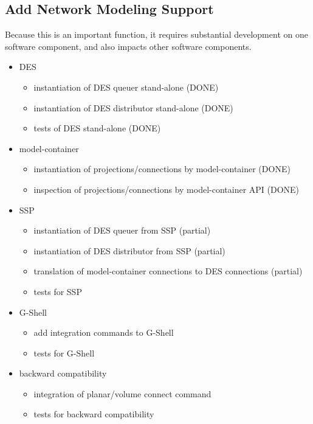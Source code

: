 \documentclass[12pt]{article}
\begin{document}
\subsection{Add Network Modeling Support}

Because this is an important function, it requires substantial
development on one software component, and also impacts other software
components.

\begin{itemize}
\item DES
  \begin{itemize}
  \item instantiation of DES queuer stand-alone (DONE)
  \item instantiation of DES distributor stand-alone (DONE)
  \item tests of DES stand-alone (DONE)
  \end{itemize}
\item model-container
  \begin{itemize}
  \item instantiation of projections/connections by model-container (DONE)
  \item inspection of projections/connections by model-container API (DONE)
  \end{itemize}
\item SSP
  \begin{itemize}
  \item instantiation of DES queuer from SSP (partial)
  \item instantiation of DES distributor from SSP (partial)
  \item translation of model-container connections to DES connections (partial)
  \item tests for SSP
  \end{itemize}
\item G-Shell
  \begin{itemize}
  \item add integration commands to G-Shell
  \item tests for G-Shell
  \end{itemize}
\item backward compatibility
  \begin{itemize}
  \item integration of planar/volume connect command
  \item tests for backward compatibility
  \end{itemize}
\end{itemize}
\end{document}
